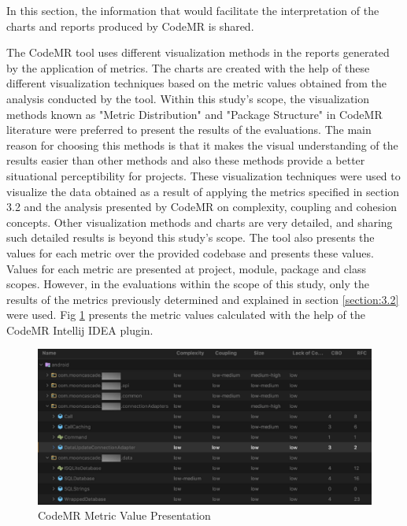 In this section, the information that would facilitate the interpretation of the charts and reports produced by CodeMR is shared.

The CodeMR tool uses different visualization methods in the reports generated by the application of metrics. The charts are created with the help of these different visualization techniques based on the metric values obtained from the analysis conducted by the tool. Within this study's scope, the visualization methods known as "Metric Distribution" and "Package Structure" in CodeMR literature were preferred to present the results of the evaluations. The main reason for choosing this methods is that it makes the visual understanding of the results easier than other methods and also these methods provide a better situational perceptibility for projects. These visualization techniques were used to visualize the data obtained as a result of applying the metrics specified in section 3.2 and the analysis presented by CodeMR on complexity, coupling and cohesion concepts. Other visualization methods and charts are very detailed, and sharing such detailed results is beyond this study's scope. The tool also presents the values for each metric over the provided codebase and presents these values. Values for each metric are presented at project, module, package and class scopes. However, in the evaluations within the scope of this study, only the results of the metrics previously determined and explained in section \ref{section:3.2} were used. Fig \ref{fig:code-mr-metric-val} presents the metric values calculated with the help of the CodeMR Intellij IDEA plugin.
\begin{figure}[ht!]
    \centering
    \includegraphics[scale=0.35]{figures/code-mr-metric-val.png}
    \caption{CodeMR Metric Value Presentation}
    \label{fig:code-mr-metric-val}
\end{figure}
\FloatBarrier

